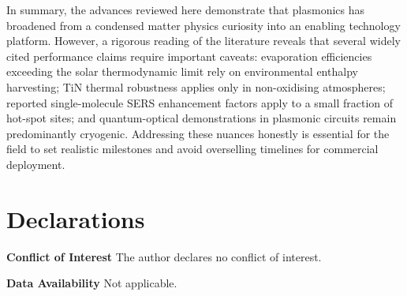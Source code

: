 \documentclass[twocolumn,10pt]{article}
\begin{document}
In summary, the advances reviewed here demonstrate that plasmonics has
broadened from a condensed matter physics curiosity into an enabling
technology platform.  However, a rigorous reading of the literature
reveals that several widely cited performance claims require important
caveats: evaporation efficiencies exceeding the solar thermodynamic
limit rely on environmental enthalpy harvesting; TiN thermal robustness
applies only in non-oxidising atmospheres; reported single-molecule SERS
enhancement factors apply to a small fraction of hot-spot sites; and
quantum-optical demonstrations in plasmonic circuits remain predominantly
cryogenic.  Addressing these nuances honestly is essential for the field
to set realistic milestones and avoid overselling timelines for
commercial deployment.

\section*{Declarations}

\textbf{Conflict of Interest} The author declares no conflict of interest.

\textbf{Data Availability} Not applicable.


\end{document}
